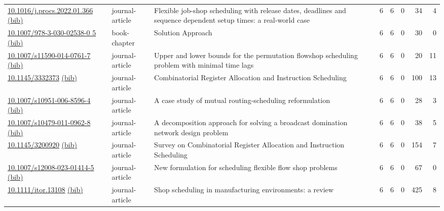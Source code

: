 {\begin{longtable}{p{5cm}lp{11cm}rrrrr}
\href{http://dx.doi.org/10.1016/j.procs.2022.01.366}{10.1016/j.procs.2022.01.366} \href{https://www.doi2bib.org/bib/10.1016/j.procs.2022.01.366}{(bib)} & journal-article & Flexible job-shop scheduling with release dates, deadlines and sequence dependent setup times: a real-world case & 6 & 6 & 0 & 34 & 4 \\
\href{http://dx.doi.org/10.1007/978-3-030-02538-0_5}{10.1007/978-3-030-02538-0 5} \href{https://www.doi2bib.org/bib/10.1007/978-3-030-02538-0_5}{(bib)} & book-chapter & Solution Approach & 6 & 6 & 0 & 30 & 0 \\
\href{http://dx.doi.org/10.1007/s11590-014-0761-7}{10.1007/s11590-014-0761-7} \href{https://www.doi2bib.org/bib/10.1007/s11590-014-0761-7}{(bib)} & journal-article & Upper and lower bounds for the permutation flowshop scheduling problem with minimal time lags & 6 & 6 & 0 & 20 & 11 \\
\href{http://dx.doi.org/10.1145/3332373}{10.1145/3332373} \href{https://www.doi2bib.org/bib/10.1145/3332373}{(bib)} & journal-article & Combinatorial Register Allocation and Instruction Scheduling & 6 & 6 & 0 & 100 & 13 \\
\href{http://dx.doi.org/10.1007/s10951-006-8596-4}{10.1007/s10951-006-8596-4} \href{https://www.doi2bib.org/bib/10.1007/s10951-006-8596-4}{(bib)} & journal-article & A case study of mutual routing-scheduling reformulation & 6 & 6 & 0 & 28 & 3 \\
\href{http://dx.doi.org/10.1007/s10479-011-0962-8}{10.1007/s10479-011-0962-8} \href{https://www.doi2bib.org/bib/10.1007/s10479-011-0962-8}{(bib)} & journal-article & A decomposition approach for solving a broadcast domination network design problem & 6 & 6 & 0 & 38 & 5 \\
\href{http://dx.doi.org/10.1145/3200920}{10.1145/3200920} \href{https://www.doi2bib.org/bib/10.1145/3200920}{(bib)} & journal-article & Survey on Combinatorial Register Allocation and Instruction Scheduling & 6 & 6 & 0 & 154 & 7 \\
\href{http://dx.doi.org/10.1007/s12008-023-01414-5}{10.1007/s12008-023-01414-5} \href{https://www.doi2bib.org/bib/10.1007/s12008-023-01414-5}{(bib)} & journal-article & New formulation for scheduling flexible flow shop problems & 6 & 6 & 0 & 67 & 0 \\
\href{http://dx.doi.org/10.1111/itor.13108}{10.1111/itor.13108} \href{https://www.doi2bib.org/bib/10.1111/itor.13108}{(bib)} & journal-article & Shop scheduling in manufacturing environments: a review & 6 & 6 & 0 & 425 & 8 \\

\end{longtable}}
